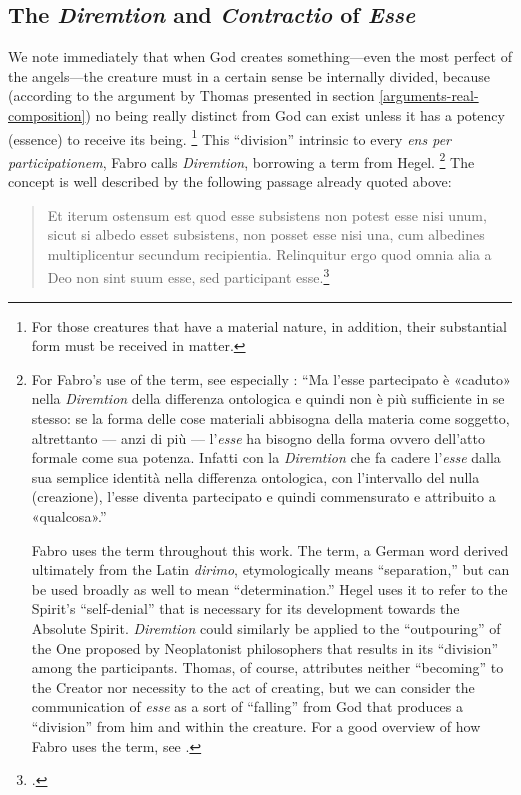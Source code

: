 \subsection{The \emph{Diremtion} and \emph{Contractio} of \emph{Esse}}
\label{sec:diremtion-contractio}

We note immediately that when God creates something—even the most perfect of the angels—the creature must in a certain sense be internally divided, because (according to the argument by Thomas presented in section \ref{arguments-real-composition}) no being really distinct from God can exist unless it has a potency (essence) to receive its being.%
%
\footnote{For those creatures that have a material nature, in addition, their substantial form must be received in matter.} This “division” intrinsic to every \emph{ens per participationem}, Fabro calls \emph{Diremtion}, borrowing a term from Hegel.%
%
\footnote{For Fabro’s use of the term, see especially \cite[350]{fabro:partecipazione}: “Ma l’esse partecipato è «caduto» nella \emph{Diremtion} della differenza ontologica e quindi non è più sufficiente in se stesso: se la forma delle cose materiali abbisogna della materia come soggetto, altrettanto — anzi di più — l’\emph{esse} ha bisogno della forma ovvero dell’atto formale come sua potenza. Infatti con la \emph{Diremtion} che fa cadere l’\emph{esse} dalla sua semplice identità nella differenza ontologica, con l’intervallo del nulla (creazione), l’esse diventa partecipato e quindi commensurato e attribuito a «qualcosa».”

Fabro uses the term throughout this work. The term, a German word derived ultimately from the Latin \emph{dirimo}, etymologically means “separation,” but can be used broadly as well to mean “determination.” Hegel uses it to refer to the Spirit’s “self-denial” that is necessary for its development towards the Absolute Spirit. \emph{Diremtion} could similarly be applied to the “outpouring” of the One proposed by Neoplatonist philosophers that results in its “division” among the participants. Thomas, of course, attributes neither “becoming” to the Creator nor necessity to the act of creating, but we can consider the communication of \emph{esse} as a sort of “falling” from God that produces a “division” from him and within the creature.
For a good overview of how Fabro uses the term, see \cite[191–196]{mitchell:being}.}
%
The concept is well described by the following passage already quoted above: 
\begin{quotation}
Et iterum ostensum est quod esse subsistens non potest esse nisi unum, sicut si albedo esset subsistens, non posset esse nisi una, cum albedines multiplicentur secundum recipientia. Relinquitur ergo quod omnia alia a Deo non sint suum esse, sed participant esse.\footcite[I, q.~44, a.~1, co.]{st:summa}
\end{quotation}
